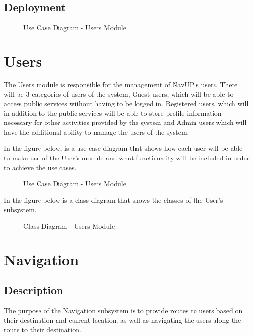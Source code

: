 \documentclass[english]{article}
\begin{document}
	   \subsection{Deployment}
	        \begin{figure}[H]
            \centering	            \centerline{}
            \caption{Use Case Diagram - Users Module}
        \end{figure}

	\section{Users}
	    The Users module is responsible for the management of NavUP's users. There will be 3 categories of users of the system, Guest users, which will be able to access public services without having to be logged in. Registered users, which will in addition to the public services will be able to store profile information necessary for other activities provided by the system and Admin users which will have the additional ability to manage the users of the system.
		
		In the figure below, is a use case diagram that shows how each user will be able to make use of the User's module and what functionality will be included in order to achieve the use cases.
		\begin{figure}[H]
            \centering	            \centerline{}
            \caption{Use Case Diagram - Users Module}
        \end{figure}
		
		In the figure below is a class diagram that shows the classes of the User's subsystem.
	    \begin{figure}[H]
            \centering	            \centerline{}
            \caption{Class Diagram - Users Module}
        \end{figure}
        


	\section{Navigation}
        \subsection{Description}
            The purpose of the Navigation subsystem is to provide routes to users based on their destination and current location, as well as navigating the users along the route to their destination.\\
\end{document}
